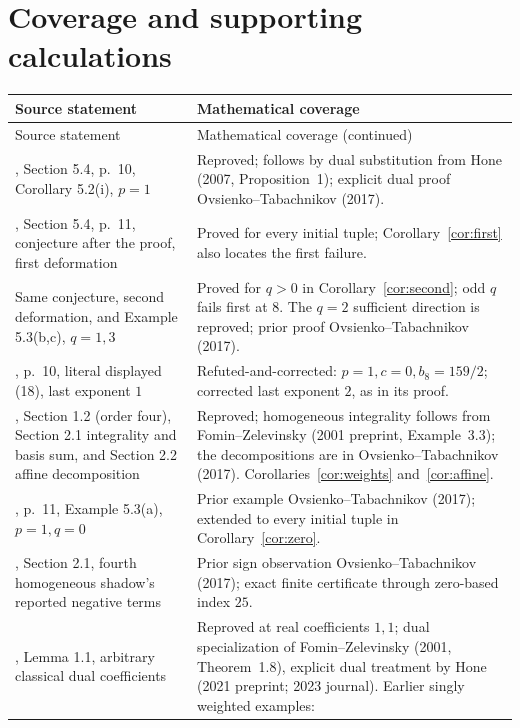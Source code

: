 \documentclass[11pt]{article}
\begin{document}
\section{Coverage and supporting calculations}
\small
\begin{longtable}{@{}>{\raggedright\arraybackslash}p{}>{\raggedright\arraybackslash}p{}@{}}
\toprule
Source statement & Mathematical coverage\\
\midrule
\endfirsthead
\toprule
Source statement & Mathematical coverage (continued)\\
\midrule
\endhead
\cite{OT}, Section 5.4, p.~10, Corollary 5.2(i), $p=1$
 & Reproved; follows by dual substitution from Hone (2007,
 Proposition~1); explicit dual proof Ovsienko--Tabachnikov (2017).\\[3pt]
\cite{OT}, Section 5.4, p.~11, conjecture after the proof, first deformation
 & Proved for every initial tuple; Corollary~\ref{cor:first} also locates the first failure.\\[3pt]
Same conjecture, second deformation, and Example 5.3(b,c), $q=1,3$
 & Proved for $q>0$ in Corollary~\ref{cor:second}; odd $q$ fails first at $8$.
 The $q=2$ sufficient direction is reproved; prior proof
 Ovsienko--Tabachnikov (2017).\\[3pt]
\cite{OT}, p.~10, literal displayed (18), last exponent $1$
 & Refuted-and-corrected: $p=1,c=0,b_8=159/2$;
 corrected last exponent $2$, as in its proof.\\[3pt]
\cite{OT}, Section 1.2 (order four), Section 2.1 integrality and basis sum,
and Section 2.2 affine decomposition
 & Reproved; homogeneous integrality follows from Fomin--Zelevinsky
 (2001 preprint, Example~3.3); the decompositions are in
 Ovsienko--Tabachnikov (2017). Corollaries~\ref{cor:weights} and~\ref{cor:affine}.\\[3pt]
\cite{OT}, p.~11, Example 5.3(a), $p=1,q=0$
 & Prior example Ovsienko--Tabachnikov (2017); extended to every
 initial tuple in Corollary~\ref{cor:zero}.\\[3pt]
\cite{OT}, Section 2.1, fourth homogeneous shadow's reported negative terms
 & Prior sign observation Ovsienko--Tabachnikov (2017);
 exact finite certificate through zero-based index $25$.\\[3pt]
\cite{Hone}, Lemma 1.1, arbitrary classical dual coefficients
 & Reproved at real coefficients $1,1$; dual specialization of
 Fomin--Zelevinsky (2001, Theorem~1.8), explicit dual treatment by
 Hone (2021 preprint; 2023 journal). Earlier singly weighted examples:

\end{longtable}
\end{document}
